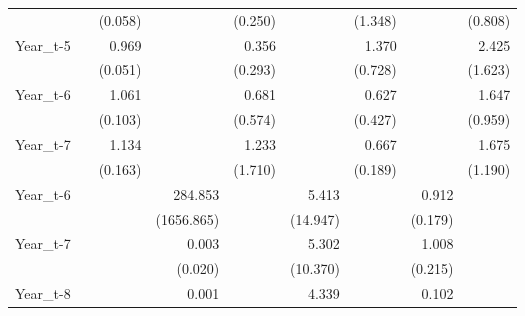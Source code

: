 \begin{table}[htbp]
\begin{tabular}{l*{8}{D{.}{.}{-1}}}
            &                     &     (0.058)         &                     &     (0.250)         &                     &     (1.348)         &                     &     (0.808)         \\
Year\_t-5    &                     &       0.969         &                     &       0.356         &                     &       1.370         &                     &       2.425         \\
            &                     &     (0.051)         &                     &     (0.293)         &                     &     (0.728)         &                     &     (1.623)         \\
Year\_t-6    &                     &       1.061         &                     &       0.681         &                     &       0.627         &                     &       1.647         \\
            &                     &     (0.103)         &                     &     (0.574)         &                     &     (0.427)         &                     &     (0.959)         \\
Year\_t-7    &                     &       1.134         &                     &       1.233         &                     &       0.667         &                     &       1.675         \\
            &                     &     (0.163)         &                     &     (1.710)         &                     &     (0.189)         &                     &     (1.190)         \\
Year\_t-6    &                     &                     &     284.853         &                     &       5.413         &                     &       0.912         &                     \\
            &                     &                     &  (1656.865)         &                     &    (14.947)         &                     &     (0.179)         &                     \\
Year\_t-7    &                     &                     &       0.003         &                     &       5.302         &                     &       1.008         &                     \\
            &                     &                     &     (0.020)         &                     &    (10.370)         &                     &     (0.215)         &                     \\
Year\_t-8    &                     &                     &       0.001         &                     &       4.339         &                     &       0.102         &                     \\

\end{tabular}
\end{table}
